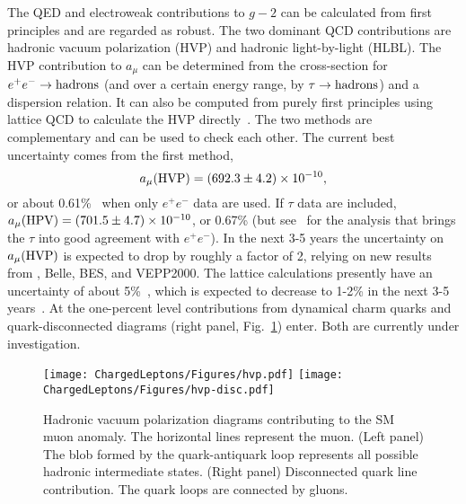 











The QED and electroweak contributions to $g-2$ can be calculated from first principles
and are regarded as robust.  The two dominant QCD contributions are hadronic vacuum polarization (HVP) and hadronic light-by-light (HLBL).
The HVP contribution to $a_\mu$ can be determined from the
cross-section for $e^+e^-\to\rm hadrons$ (and over a certain energy
range, by $\tau\to\rm hadrons$) and a dispersion relation. It can also
be computed from purely first principles using lattice QCD to
calculate the HVP directly~\cite{hep-lat/0212018}. The two methods are
complementary and can be used to check each other. The current best
uncertainty comes from the first method,
\begin{equation}
a_\mu(\rm HVP)=(692.3\pm4.2)\times 10^{-10},
\end{equation}
or about 0.61\%~\cite{arXiv:1010.4180} when only $e^+e^-$ data are used. 
If $\tau$ data are included, $a_\mu(\rm HPV)=(701.5\pm4.7)\times 10^{-10}$, or 0.67\% 
(but see~\cite{arXiv:1101.2872} for the analysis that brings the $\tau$ 
into good agreement with $e^+e^-$). In the next 3-5 years the uncertainty on 
$a_\mu(\rm HVP)$ is expected to drop by roughly a factor of 2, relying 
on new results from {\babar}, Belle, BES, and VEPP2000.
The lattice calculations presently have an uncertainty of 
about 5\%~\cite{hep-lat/0608011, arXiv:1103.4818, Boyle:2011hu,  DellaMorte:2011aa}, which is 
expected to decrease to 1-2\% in the next 3-5 years~\cite{USQCD}. At the 
one-percent level contributions from dynamical charm quarks and quark-disconnected 
diagrams (right panel, Fig.~\ref{fig:hvp}) enter. Both are currently under investigation.
%
\begin{figure}[bp]
    \centering
    \texttt{[image: ChargedLeptons/Figures/hvp.pdf]}\hskip 1cm
    \texttt{[image: ChargedLeptons/Figures/hvp-disc.pdf]}
\caption{Hadronic vacuum polarization diagrams contributing to the SM muon anomaly. The horizontal lines represent the muon. (Left panel) The blob formed by the quark-antiquark loop represents all possible hadronic intermediate states.  (Right panel) Disconnected quark line contribution. The quark loops are connected by gluons.}

    \label{fig:hvp}
\end{figure}
%

